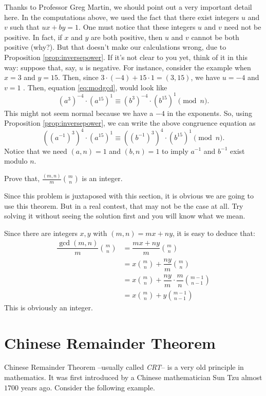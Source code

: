 \documentclass{subfile}
\begin{document}
\begin{remark}
		Thanks to Professor Greg Martin, we should point out a very important detail here. In the computations above, we used the fact that there exist integers $u$ and $v$ such that $ux+by = 1$. One must notice that these integers $u$ and $v$ need not be positive. In fact, if $x$ and $y$ are both positive, then $u$ and $v$ cannot be both positive (why?). But that doesn't make our calculations wrong, due to Proposition \ref{prop:inversepower}. If it's not clear to you yet, think of it in this way: suppose that, say, $u$ is negative. For instance, consider the example when $x=3$ and $y=15$. Then, since $3 \cdot (-4) + 15 \cdot 1 = (3,15)$, we have $u=-4$ and $v=1$ . Then, equation \eqref{eq:modgcd}, would look like $$(a^3)^{-4} \cdot (a^{15})^{1} \equiv (b^3)^{-4} \cdot (b^{15})^{1} \pmod n.$$
		This might not seem normal because we have a $-4$ in the exponents. So, using Proposition \ref{prop:inversepower}, we can write the above congruence equation as
		$$\left(\left(a^{-1}\right)^3\right)^{4} \cdot (a^{15})^{1} \equiv \left(\left(b^{-1}\right)^3\right)^{4} \cdot (b^{15})^{1} \pmod n.$$
		Notice that we need $(a,n)=1$ and $(b,n)=1$ to imply $a^{-1}$ and $b^{-1}$ exist modulo $n$.
\end{remark}

	\begin{problem}
		Prove that, $\frac{(m,n)}{m}\binom{m}{n}$ is an integer.
	\end{problem}
	Since this problem is juxtaposed with this section, it is obvious we are going to use this theorem. But in a real contest, that may  not be the case at all. Try solving it without seeing the solution first and you will know what we mean.
	\begin{solution}
		Since there are integers $x,y$ with $(m,n)=mx+ny$, it is easy to deduce that:
			\begin{align*}
				\dfrac{\gcd(m,n)}{m}\binom{m}{n}
					& = \dfrac{mx+ny}{m}\binom{m}{n}\\
					& = x\binom{m}{n}+\dfrac{ny}{m}\binom{m}{n}\\
					& = x\binom{m}{n}+\dfrac{ny}{m}\cdot\dfrac{m}{n}\binom{m-1}{n-1}\\
					& = x\binom{m}{n}+y\binom{m-1}{n-1}
			\end{align*}
		This is obviously an integer.
	\end{solution}

\section{Chinese Remainder Theorem}
	Chinese Remainder Theorem --usually called \textit{CRT}-- is a very old principle in mathematics. It was first introduced by a Chinese mathematician Sun Tzu almost $1700$ years ago. Consider the following example.
\end{document}
